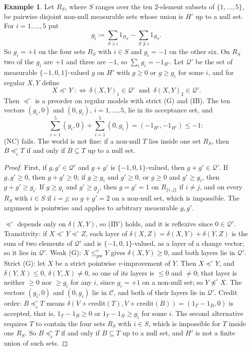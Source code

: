 \documentclass[11pt]{article}
\theoremstyle{definition}\newtheorem{definition}[theorem]{Definition}
\newtheorem{example}[theorem]{Example}
\theoremstyle{remark}\newtheorem{remark}[theorem]{Remark}
\newcommand{\cred}{\mathrm{credit}}
\newcommand{\pw}{\mathrm{pw}}
\begin{document}
\begin{example}\label{ex:half5}
Let $R_S$, where $S$ ranges over the ten $2$-element subsets of
$\{1,\dots,5\}$, be pairwise disjoint non-null measurable sets whose union is
$H'$ up to a null set. For $i=1,\dots,5$ put
\[
 g_i\coloneqq\sum_{S\ni i}1_{R_S}-\sum_{S\not\ni i}1_{R_S}.
\]
So $g_i=+1$ on the four sets $R_S$ with $i\in S$ and $g_i=-1$ on the other
six. On $R_S$ two of the $g_i$ are $+1$ and three are $-1$, so
$\sum_ig_i=-1_{H'}$. Let $\mathcal Q'$ be the set of measurable
$\{-1,0,1\}$-valued $g$ on $H'$ with $g\ge0$ or $g\ge g_i$ for some $i$, and
for regular $X,Y$ define
\[
 X\preceq^\circ Y\ :\Longleftrightarrow\ \delta(X,Y)_1\in\mathcal Q'\
 \text{ and }\ \delta(X,Y)_2\in\mathcal Q' .
\]
Then $\preceq^\circ$ is a preorder on regular models with strict (G) and
(IB). The ten vectors $(g_i,0)$ and $(0,g_i)$, $i=1,\dots,5$, lie in its
acceptance set, and
\[
 \sum_{i=1}^5(g_i,0)+\sum_{i=1}^5(0,g_i)=(-1_{H'},-1_{H'})\le-1 :
\]
(NC) fails. The world is not fine: if a non-null $T$ lies inside one set
$R_S$, then $B\preceq^\circ_cT$ if and only if $B\subseteq T$ up to a null
set.
\end{example}
\begin{proof}
First, if $g,g'\in\mathcal Q'$ and $g+g'$ is $\{-1,0,1\}$-valued, then
$g+g'\in\mathcal Q'$. If $g,g'\ge0$, then $g+g'\ge0$; if $g\ge g_i$ and
$g'\ge0$, or $g\ge0$ and $g'\ge g_i$, then $g+g'\ge g_i$. If $g\ge g_i$ and
$g'\ge g_j$, then $g=g'=1$ on $R_{\{i,j\}}$ if $i\ne j$, and on every $R_S$
with $i\in S$ if $i=j$; so $g+g'=2$ on a non-null set, which is impossible.
The argument is pointwise and applies to arbitrary measurable $g,g'$.

$\preceq^\circ$ depends only on $\delta(X,Y)$, so (IB$'$) holds, and it is
reflexive since $0\in\mathcal Q'$. Transitivity: if $X\preceq^\circ
Y\preceq^\circ Z$, each layer of $\delta(X,Z)=\delta(X,Y)+\delta(Y,Z)$ is
the sum of two elements of $\mathcal Q'$ and is $\{-1,0,1\}$-valued, as a
layer of a change vector; so it lies in $\mathcal Q'$. Weak (G):
$X\le^v_\pw Y$ gives $\delta(X,Y)\ge0$, and both layers lie in
$\mathcal Q'$. Strict (G): let $X$ be a strict pointwise $v$-improvement of
$Y$. Then $X\preceq^\circ Y$, and $\delta(Y,X)\le0$, $\delta(Y,X)\ne0$, so
one of its layers is $\le0$ and $\ne0$; that layer is neither $\ge0$ nor
$\ge g_i$ for any $i$, since $g_i=+1$ on a non-null set; so
$Y\not\preceq^\circ X$. The vectors $(g_i,0)$ and $(0,g_i)$ lie in
$\mathcal C$, and both of their layers lie in $\mathcal Q'$. Credit order:
$B\preceq^\circ_cT$ means $\delta(V+\cred(T),V+\cred(B))=(1_T-1_B,0)$ is
accepted, that is, $1_T-1_B\ge0$ or $1_T-1_B\ge g_i$ for some $i$. The
second alternative requires $T$ to contain the four sets $R_S$ with $i\in
S$, which is impossible for $T$ inside one $R_S$. So $B\preceq^\circ_cT$ if
and only if $B\subseteq T$ up to a null set, and $H'$ is not a finite union
of such sets.
\end{proof}
\end{document}
